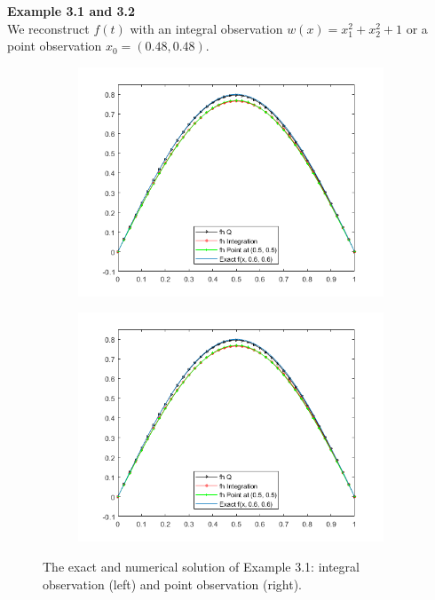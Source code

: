 \documentclass[]{article}
\begin{document}
\newpage
\noindent\textbf{Example 3.1 and 3.2}
\\
We reconstruct $f(t)$ with an integral observation $w(x)=x_1^2+x_2^2+1$ or a point observation $x_0=(0.48, 0.48).$
\begin{figure}[h!]
	\begin{subfigure}{.5\linewidth}
		\centering
		\includegraphics[width=\linewidth]{../FreeFem++/fhx}
	\end{subfigure}%
	\begin{subfigure}{.5\linewidth}
		\centering
		\includegraphics[width=\linewidth]{../FreeFem++/fhx}
	\end{subfigure}
	\caption{The exact and numerical solution of Example 3.1: integral observation (left) and point observation (right).}
\end{figure}
\end{document}
